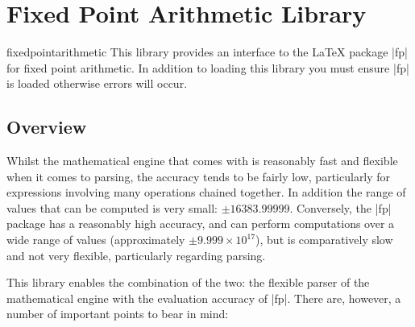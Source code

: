 %
%
%


\section{Fixed Point Arithmetic Library}

\begin{pgflibrary}{fixedpointarithmetic}
  This library provides an interface to the \LaTeX{} package
  |fp| for fixed point arithmetic. 	In addition to loading this
  library you must ensure |fp| is loaded otherwise errors
  will occur.
\end{pgflibrary}

\subsection{Overview}

  Whilst the mathematical engine that comes with \pgfname{} is
  reasonably fast and flexible when it comes to parsing, the accuracy
  tends to be fairly low, particularly for expressions involving many
  operations chained together. In addition the range of values that
  can be computed is very small: $\pm16383.99999$.
	Conversely, the |fp| package has a reasonably high accuracy, and
	can	perform computations over a wide range of
	values (approximately $\pm9.999\times10^{17}$), but is comparatively
	slow and not very
	flexible, particularly regarding parsing.

  This library enables the combination of the two: the flexible parser
  of the \pgfname{} mathematical engine with the evaluation accuracy
  of |fp|. There are, however, a number of important points to
  bear in mind:

